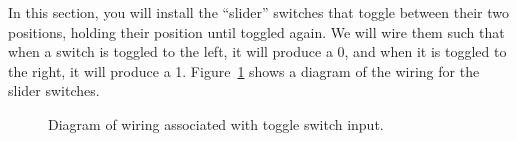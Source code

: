 In this section, you will install the ``slider'' switches that toggle between their two positions, holding their position until toggled again.
We will wire them such that when a switch is toggled to the left, it will produce a 0, and when it is toggled to the right, it will produce a 1.
Figure~\ref{fig:switch-diagram} shows a diagram of the wiring for the slider switches.

\begin{figure}[p]
    \centering
    \caption{Diagram of wiring associated with toggle switch input.
        \label{fig:switch-diagram}}
\end{figure}

\disconnect\


